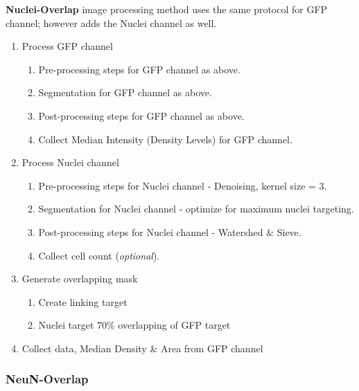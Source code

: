 \noindent\textbf{Nuclei-Overlap} image processing method uses the same protocol for GFP channel; however adds the Nuclei channel as well.
\begin{enumerate}
\item Process GFP channel
  \begin{enumerate}
  \item Pre-processing steps for GFP channel as above.
  \item Segmentation for GFP channel as above.
  \item Post-processing steps for GFP channel as above.
  \item Collect Median Intensity (Density Levels) for GFP channel.
  \end{enumerate}
\item Process Nuclei channel
  \begin{enumerate}
  \item Pre-processing steps for Nuclei channel - Denoising, kernel size = 3.
  \item Segmentation for Nuclei channel - optimize for maximum nuclei targeting.
  \item Post-processing steps for Nuclei channel - Watershed \& Sieve.
  \item Collect cell count (\textit{optional}).
  \end{enumerate}
\item Generate overlapping mask
  \begin{enumerate}
  \item Create linking target
  \item Nuclei target 70\% overlapping of GFP target
  \end{enumerate}
\item Collect data, Median Density \& Area from GFP channel
\end{enumerate}
\pagebreak
\subsubsection*{NeuN-Overlap}

